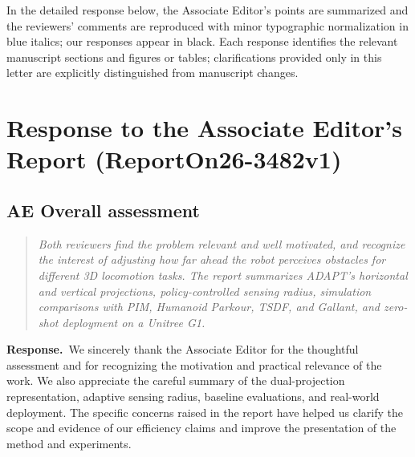 \documentclass[11pt]{article}
\newenvironment{reviewcomment}{\begin{quote}\color{reviewblue}\itshape}{\end{quote}}
\newcommand{\Response}{\par\noindent\textbf{Response.}\ }
\begin{document}
In the detailed response below, the Associate Editor's points are summarized and the reviewers' comments are reproduced with minor typographic normalization in \textcolor{reviewblue}{blue italics}; our responses appear in black. Each response identifies the relevant manuscript sections and figures or tables; clarifications provided only in this letter are explicitly distinguished from manuscript changes.

\clearpage
\section*{Response to the Associate Editor's Report (ReportOn26-3482v1)}
\subsection*{AE Overall assessment}
\begin{reviewcomment}
Both reviewers find the problem relevant and well motivated, and recognize the interest of adjusting how far ahead the robot perceives obstacles for different 3D locomotion tasks. The report summarizes ADAPT's horizontal and vertical projections, policy-controlled sensing radius, simulation comparisons with PIM, Humanoid Parkour, TSDF, and Gallant, and zero-shot deployment on a Unitree G1.
\end{reviewcomment}
\Response We sincerely thank the Associate Editor for the thoughtful assessment and for recognizing the motivation and practical relevance of the work. We also appreciate the careful summary of the dual-projection representation, adaptive sensing radius, baseline evaluations, and real-world deployment. The specific concerns raised in the report have helped us clarify the scope and evidence of our efficiency claims and improve the presentation of the method and experiments.
\end{document}

